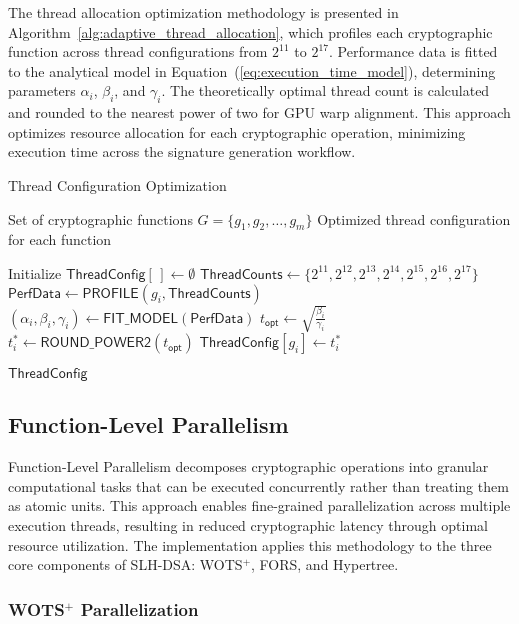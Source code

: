 \documentclass[journal]{IEEEtran}
\begin{document}
The thread allocation optimization methodology is presented in Algorithm~\ref{alg:adaptive_thread_allocation}, which profiles each cryptographic function across thread configurations from $2^{11}$ to $2^{17}$. Performance data is fitted to the analytical model in Equation~(\ref{eq:execution_time_model}), determining parameters $\alpha_i$, $\beta_i$, and $\gamma_i$. The theoretically optimal thread count is calculated and rounded to the nearest power of two for GPU warp alignment. This approach optimizes resource allocation for each cryptographic operation, minimizing execution time across the signature generation workflow.

\begin{algorithm}
  \caption{Thread Configuration Optimization}
  \label{alg:adaptive_thread_allocation}
  \begin{algorithmic}[1]
    \REQUIRE Set of cryptographic functions $G = \{g_1, g_2, \ldots, g_m\}$
    \ENSURE Optimized thread configuration for each function

    \STATE Initialize $\textsf{ThreadConfig}[\,] \gets \emptyset$
    \STATE $\textsf{ThreadCounts} \gets \{2^{11}, 2^{12}, 2^{13}, 2^{14}, 2^{15}, 2^{16}, 2^{17}\}$
    \STATE $\textsf{PerfData} \gets \textsf{PROFILE}(g_i, \textsf{ThreadCounts})$
    \STATE $(\alpha_i, \beta_i, \gamma_i) \gets \textsf{FIT\_MODEL}(\textsf{PerfData})$
    \STATE $t_{\textsf{opt}} \gets \sqrt{\frac{\beta_i}{\gamma_i}}$
    \STATE $t_i^* \gets \textsf{ROUND\_POWER2}(t_{\textsf{opt}})$
    \STATE $\textsf{ThreadConfig}[g_i] \gets t_i^*$
    \ENDFOR

    \RETURN $\textsf{ThreadConfig}$
  \end{algorithmic}
\end{algorithm}

\subsection{Function-Level Parallelism}

Function-Level Parallelism  decomposes cryptographic operations into granular computational tasks that can be executed concurrently rather than treating them as atomic units. This approach enables fine-grained parallelization across multiple execution threads, resulting in reduced cryptographic latency through optimal resource utilization. The implementation applies this methodology to the three core components of SLH-DSA: WOTS$^+$, FORS, and Hypertree.

\subsubsection{WOTS\texorpdfstring{$^+$}{+} Parallelization}
\end{document}
